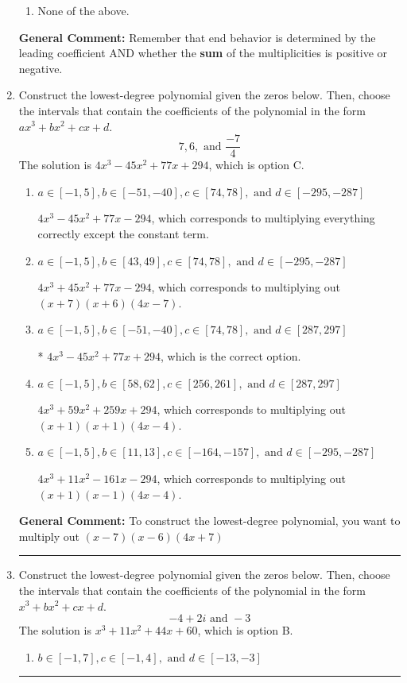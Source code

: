 \documentclass{extbook}[14pt]
\newcommand{\litem}[1]{\item #1

\rule{\textwidth}{0.4pt}}
\begin{document}
\begin{enumerate}
{\begin{enumerate}[label=\Alph*.]
\begin{multicols}{2}
\end{multicols}\item None of the above.\end{enumerate}
\textbf{General Comment:} Remember that end behavior is determined by the leading coefficient AND whether the \textbf{sum} of the multiplicities is positive or negative.
}
\litem{
Construct the lowest-degree polynomial given the zeros below. Then, choose the intervals that contain the coefficients of the polynomial in the form $ax^3+bx^2+cx+d$.
\[ 7, 6, \text{ and } \frac{-7}{4} \]
The solution is \( 4x^{3} -45 x^{2} +77 x + 294 \), which is option C.\begin{enumerate}[label=\Alph*.]
\item \( a \in [-1, 5], b \in [-51, -40], c \in [74, 78], \text{ and } d \in [-295, -287] \)

$4x^{3} -45 x^{2} +77 x -294$, which corresponds to multiplying everything correctly except the constant term.
\item \( a \in [-1, 5], b \in [43, 49], c \in [74, 78], \text{ and } d \in [-295, -287] \)

$4x^{3} +45 x^{2} +77 x -294$, which corresponds to multiplying out $(x + 7)(x + 6)(4x -7)$.
\item \( a \in [-1, 5], b \in [-51, -40], c \in [74, 78], \text{ and } d \in [287, 297] \)

* $4x^{3} -45 x^{2} +77 x + 294$, which is the correct option.
\item \( a \in [-1, 5], b \in [58, 62], c \in [256, 261], \text{ and } d \in [287, 297] \)

$4x^{3} +59 x^{2} +259 x + 294$, which corresponds to multiplying out $(x + 1)(x + 1)(4x -4)$.
\item \( a \in [-1, 5], b \in [11, 13], c \in [-164, -157], \text{ and } d \in [-295, -287] \)

$4x^{3} +11 x^{2} -161 x -294$, which corresponds to multiplying out $(x + 1)(x -1)(4x -4)$.
\end{enumerate}

\textbf{General Comment:} To construct the lowest-degree polynomial, you want to multiply out $(x -7)(x -6)(4x + 7)$
}
\litem{
Construct the lowest-degree polynomial given the zeros below. Then, choose the intervals that contain the coefficients of the polynomial in the form $x^3+bx^2+cx+d$.
\[ -4 + 2 i \text{ and } -3 \]
The solution is \( x^{3} +11 x^{2} +44 x + 60 \), which is option B.\begin{enumerate}[label=\Alph*.]
\item \( b \in [-1, 7], c \in [-1, 4], \text{ and } d \in [-13, -3] \)


\end{enumerate}}
\end{enumerate}
\end{document}
